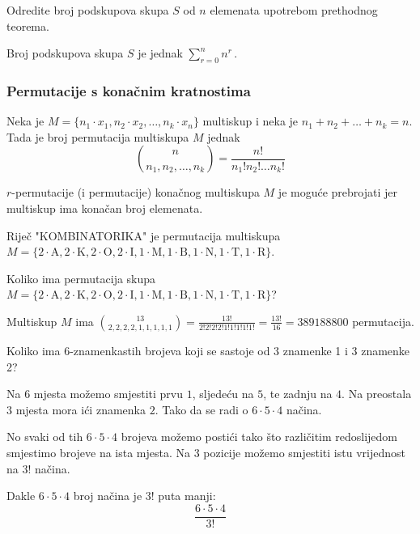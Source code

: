 \begin{problem}
    Odredite broj podskupova skupa $S$ od $n$ elemenata upotrebom prethodnog
    teorema.
\end{problem}

Broj podskupova skupa $S$ je jednak $\sum_{r=0}^{n} n^r\,$.

\subsubsection{Permutacije s konačnim kratnostima}

\begin{theorem}
    Neka je $M = \{n_1 \cdot x_1, n_2 \cdot x_2, \dots, n_k \cdot x_n\}$
    multiskup i neka je $n_1+n_2+\dots+n_k=n$. Tada je broj permutacija
    multiskupa $M$ jednak
    $$
        \binom{n}{n_1, n_2, \dots, n_k} = \frac{n!}{n_1!n_2! \dots n_k!}
    $$
\end{theorem}

\bigskip
$r$-permutacije (i permutacije) konačnog multiskupa $M$ je moguće prebrojati jer
multiskup ima konačan broj elemenata.

\begin{example}
    Riječ "KOMBINATORIKA" je permutacija multiskupa $M = \{2 \cdot \text{A}, 2
    \cdot \text{K}, 2 \cdot \text{O}, 2 \cdot \text{I}, 1 \cdot \text{M}, 1
    \cdot \text{B}, 1 \cdot \text{N}, 1 \cdot \text{T}, 1 \cdot \text{R} \}$.
\end{example}

\begin{problem}
    Koliko ima permutacija skupa $M = \{2 \cdot \text{A}, 2 \cdot \text{K}, 2
    \cdot \text{O}, 2 \cdot \text{I}, 1 \cdot \text{M}, 1 \cdot \text{B}, 1
    \cdot \text{N}, 1 \cdot \text{T}, 1 \cdot \text{R} \}$?
\end{problem}

Multiskup $M$ ima
$
\displaystyle\binom{13}{2,2,2,2,1,1,1,1,1} = \frac{13!}{2!2!2!2!1!1!1!1!1!} = \frac{13!}{16} = 389188800
$
permutacija.

\begin{problem}
    Koliko ima 6-znamenkastih brojeva koji se sastoje od 3 znamenke 1 i 3
    znamenke 2?
\end{problem}

Na $6$ mjesta možemo smjestiti prvu $1$, sljedeću na $5$, te zadnju na $4$. Na
preostala $3$ mjesta mora ići znamenka $2$. Tako da se radi o $6\cdot 5\cdot 4$
načina.

No svaki od tih $6\cdot 5\cdot 4$ brojeva možemo postići tako što različitim
redoslijedom smjestimo brojeve na ista mjesta. Na 3 pozicije možemo smjestiti
istu vrijednost na $3!$ načina.

Dakle $6\cdot 5\cdot 4$ broj načina je $3!$ puta manji:
$$
\frac{6\cdot 5\cdot 4}{3!}
$$


